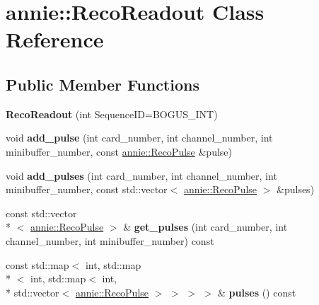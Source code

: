 \hypertarget{classannie_1_1RecoReadout}{\section{annie\-:\-:Reco\-Readout Class Reference}
\label{classannie_1_1RecoReadout}
}
\subsection*{Public Member Functions}
\begin{DoxyCompactItemize}
\item 
\hypertarget{classannie_1_1RecoReadout_a895b169058fbedb1a33c17101b299426}{{\bfseries Reco\-Readout} (int Sequence\-I\-D=B\-O\-G\-U\-S\-\_\-\-I\-N\-T)}\label{classannie_1_1RecoReadout_a895b169058fbedb1a33c17101b299426}

\item 
\hypertarget{classannie_1_1RecoReadout_aeeeb5f5b5fe7cce67513f69a0a98eedc}{void {\bfseries add\-\_\-pulse} (int card\-\_\-number, int channel\-\_\-number, int minibuffer\-\_\-number, const \hyperlink{classannie_1_1RecoPulse}{annie\-::\-Reco\-Pulse} \&pulse)}\label{classannie_1_1RecoReadout_aeeeb5f5b5fe7cce67513f69a0a98eedc}

\item 
\hypertarget{classannie_1_1RecoReadout_ab9d0fa2b7d46c297b275bddda316cb48}{void {\bfseries add\-\_\-pulses} (int card\-\_\-number, int channel\-\_\-number, int minibuffer\-\_\-number, const std\-::vector$<$ \hyperlink{classannie_1_1RecoPulse}{annie\-::\-Reco\-Pulse} $>$ \&pulses)}\label{classannie_1_1RecoReadout_ab9d0fa2b7d46c297b275bddda316cb48}

\item 
\hypertarget{classannie_1_1RecoReadout_a641407363a62f44da1264a533bb9b033}{const std\-::vector\\*
$<$ \hyperlink{classannie_1_1RecoPulse}{annie\-::\-Reco\-Pulse} $>$ \& {\bfseries get\-\_\-pulses} (int card\-\_\-number, int channel\-\_\-number, int minibuffer\-\_\-number) const }\label{classannie_1_1RecoReadout_a641407363a62f44da1264a533bb9b033}

\item 
\hypertarget{classannie_1_1RecoReadout_a8459748f093e5ab9545fcdd8283e6edc}{const std\-::map$<$ int, std\-::map\\*
$<$ int, std\-::map$<$ int, \\*
std\-::vector$<$ \hyperlink{classannie_1_1RecoPulse}{annie\-::\-Reco\-Pulse} $>$ $>$ $>$ $>$ \& {\bfseries pulses} () const }\label{classannie_1_1RecoReadout_a8459748f093e5ab9545fcdd8283e6edc}


\end{DoxyCompactItemize}
